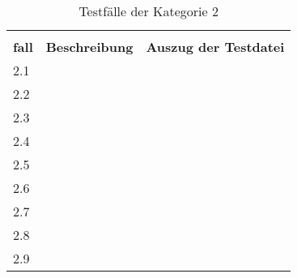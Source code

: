 \begin{table}[htp]
  \centering
  \begin{tabularx}{\columnwidth}{lXl}
    \toprule
    \begin{tabular}{@{}l@{}}\textbf{Test-} \\ \textbf{fall} \end{tabular} & \textbf{Beschreibung} & \textbf{Auszug der Testdatei} \\
    \midrule
    2.1                                                                   &                       &                               \\
    \midrule
    2.2                                                                   &                       &                               \\
    \midrule
    2.3                                                                   &                       &                               \\
    \midrule
    2.4                                                                   &                       &                               \\
    \midrule
    2.5                                                                   &                       &                               \\
    \midrule
    2.6                                                                   &                       &                               \\
    \midrule
    2.7                                                                   &                       &                               \\
    \midrule
    2.8                                                                   &                       &                               \\
    \midrule
    2.9                                                                   &                       &                               \\
    \bottomrule
  \end{tabularx}
  \caption{Testfälle der Kategorie 2}
  \label{tbl:evaluation-test-cases-category-2}
\end{table}


